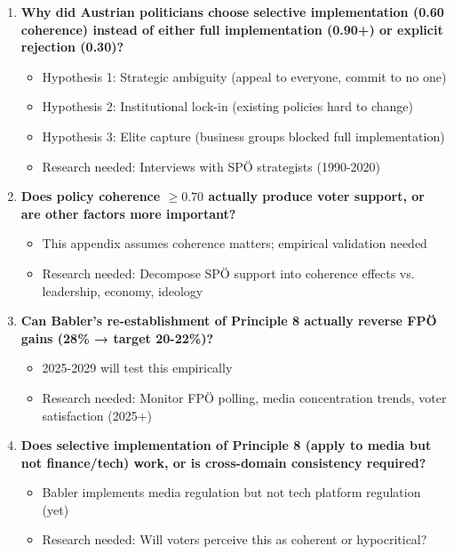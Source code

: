 \begin{enumerate}

\item \textbf{Why did Austrian politicians choose selective implementation (0.60 coherence) instead of either full implementation (0.90+) or explicit rejection (0.30)?}
\begin{itemize}
\item Hypothesis 1: Strategic ambiguity (appeal to everyone, commit to no one)
\item Hypothesis 2: Institutional lock-in (existing policies hard to change)
\item Hypothesis 3: Elite capture (business groups blocked full implementation)
\item Research needed: Interviews with SPÖ strategists (1990-2020)
\end{itemize}

\item \textbf{Does policy coherence $\geq 0.70$ actually produce voter support, or are other factors more important?}
\begin{itemize}
\item This appendix assumes coherence matters; empirical validation needed
\item Research needed: Decompose SPÖ support into coherence effects vs. leadership, economy, ideology
\end{itemize}

\item \textbf{Can Babler's re-establishment of Principle 8 actually reverse FPÖ gains (28\% → target 20-22\%)?}
\begin{itemize}
\item 2025-2029 will test this empirically
\item Research needed: Monitor FPÖ polling, media concentration trends, voter satisfaction (2025+)
\end{itemize}

\item \textbf{Does selective implementation of Principle 8 (apply to media but not finance/tech) work, or is cross-domain consistency required?}
\begin{itemize}
\item Babler implements media regulation but not tech platform regulation (yet)
\item Research needed: Will voters perceive this as coherent or hypocritical?
\end{itemize}

\end{enumerate}

